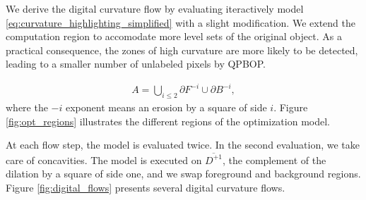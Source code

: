 \documentclass[runningheads]{llncs}
\begin{document}
We derive the digital curvature flow by evaluating iteractively model \eqref{eq:curvature_highlighting_simplified} with a slight modification. We extend the computation region to accomodate more level sets of the original object. As a practical consequence, the zones of high curvature are more likely to be detected, leading to a smaller number of unlabeled pixels by QPBOP.

\begin{align*}
	A = \bigcup_{i\leq2}{ \partial F^{-i} \cup \partial B^{-i} },
\end{align*}
where the $-i$ exponent means an erosion by a square of side $i$. Figure \ref{fig:opt_regions} illustrates the different regions of the optimization model. 

At each flow step, the model is evaluated twice. In the second evaluation, we take care of concavities. The model is executed on $\overline{D^{+1}}$, the complement of the dilation by a square of side one, and we swap foreground and background regions. Figure \ref{fig:digital_flows} presents several digital curvature flows.
\end{document}
